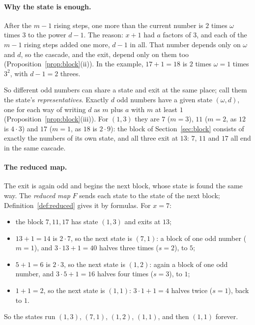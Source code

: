 \documentclass[11pt]{article}
\theoremstyle{remark}
\newcommand{\w}{\omega}
\begin{document}
\paragraph{Why the state is enough.} After the $m-1$ rising steps, one more than the current number is $2$ times $\w$ times $3$ to the power $d - 1$. The reason: $x+1$ had $a$ factors of $3$, and each of the $m - 1$ rising steps added one more, $d-1$ in all. That number depends only on $\w$ and $d$, so the cascade, and the exit, depend only on them too (Proposition~\ref{prop:block}(ii)). In the example, $17 + 1 = 18$ is $2$ times $\w = 1$ times $3^2$, with $d - 1 = 2$ threes.

So different odd numbers can share a state and exit at the same place; call them the state's \emph{representatives}. Exactly $d$ odd numbers have a given state $(\w, d)$, one for each way of writing $d$ as $m$ plus $a$ with $m$ at least $1$ (Proposition~\ref{prop:block}(iii)). For $(1,3)$ they are $7$ ($m = 3$), $11$ ($m = 2$, as $12$ is $4 \cdot 3$) and $17$ ($m = 1$, as $18$ is $2 \cdot 9$): the block of Section~\ref{sec:block} consists of exactly the numbers of its own state, and all three exit at $13$: $7$, $11$ and $17$ all end in the same cascade.

\paragraph{The reduced map.} The exit is again odd and begins the next block, whose state is found the same way. The \emph{reduced map} $F$ sends each state to the state of the next block; Definition~\ref{def:reduced} gives it by formulas. For $x = 7$:
\begin{itemize}
\item the block $7, 11, 17$ has state $(1,3)$ and exits at $13$;
\item $13 + 1 = 14$ is $2 \cdot 7$, so the next state is $(7,1)$: a block of one odd number ($m = 1$), and $3 \cdot 13 + 1 = 40$ halves three times ($s = 2$), to $5$;
\item $5 + 1 = 6$ is $2 \cdot 3$, so the next state is $(1,2)$: again a block of one odd number, and $3 \cdot 5 + 1 = 16$ halves four times ($s = 3$), to $1$;
\item $1 + 1 = 2$, so the next state is $(1,1)$: $3 \cdot 1 + 1 = 4$ halves twice ($s = 1$), back to $1$.
\end{itemize}
So the states run $(1,3)$, $(7,1)$, $(1,2)$, $(1,1)$, and then $(1,1)$ forever.
\end{document}
